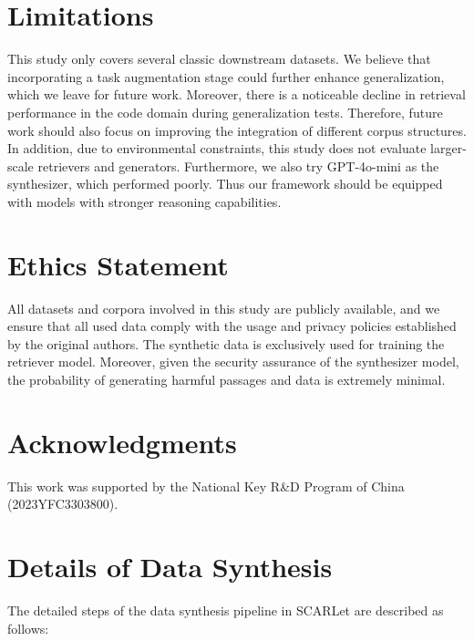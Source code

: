 \documentclass[11pt]{article}
\begin{document}
\section*{Limitations}

This study only covers several classic downstream datasets. We believe that incorporating a task augmentation stage could further enhance generalization, which we leave for future work. Moreover, there is a noticeable decline in retrieval performance in the code domain during generalization tests. Therefore, future work should also focus on improving the integration of different corpus structures. In addition, due to environmental constraints, this study does not evaluate larger-scale retrievers and generators. Furthermore, we also try GPT-4o-mini as the synthesizer, which performed poorly. Thus our framework should be equipped with models with stronger reasoning capabilities.



\section*{Ethics Statement}

All datasets and corpora involved in this study are publicly available, and we ensure that all used data comply with the usage and privacy policies established by the original authors. The synthetic data is exclusively used for training the retriever model. Moreover, given the security assurance of the synthesizer model, the probability of generating harmful passages and data is extremely minimal.





\section*{Acknowledgments}

This work was supported by the National Key R\&D Program of China (2023YFC3303800).







\clearpage
\appendix

\section{Details of Data Synthesis}
\label{sec:appendix_a}

The detailed steps of the data synthesis pipeline in SCARLet are described as follows:
\end{document}
